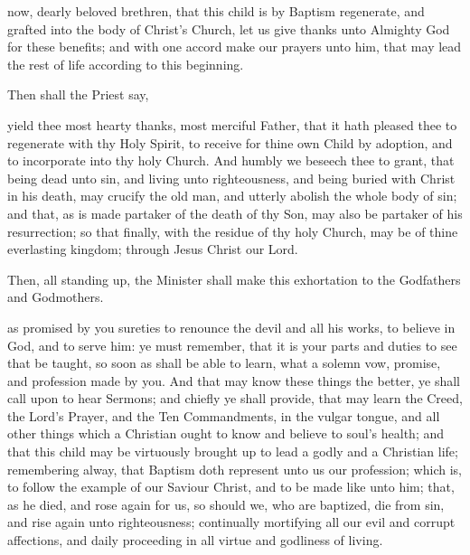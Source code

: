  now, dearly beloved brethren, that this child is by Baptism regenerate, and grafted into the body of Christ's Church, let us give thanks unto Almighty God for these benefits; and with one accord make our prayers unto him, that  may lead the rest of  life according to this beginning.

\begin{rubric}
Then shall the Priest say,
\end{rubric}

 yield thee most hearty thanks, most merciful Father, that it hath pleased thee to regenerate  with thy Holy Spirit, to receive  for thine own Child by adoption, and to incorporate  into thy holy Church.
And humbly we beseech thee to grant, that  being dead unto sin, and living unto righteousness, and being buried with Christ in his death, may crucify the old man, and utterly abolish the whole body of sin; and that, as  is made partaker of the death of thy Son,  may also be partaker of his resurrection; so that finally, with the residue of thy holy Church,  may be  of thine everlasting kingdom; through Jesus Christ our Lord.

\newpage

\begin{rubric}
Then, all standing up, the Minister shall make this exhortation to the Godfathers and Godmothers.
\end{rubric}

 as  promised by you  sureties to renounce the devil and all his works, to believe in God, and to serve him: ye must remember, that it is your parts and duties to see that  be taught, so soon as  shall be able to learn, what a solemn vow, promise, and profession  made by you.
And that  may know these things the better, ye shall call upon  to hear Sermons; and chiefly ye shall provide, that  may learn the Creed, the Lord's Prayer, and the Ten Commandments, in the vulgar tongue, and all other things which a Christian ought to know and believe to  soul's health; and that this child may be virtuously brought up to lead a godly and a Christian life; remembering alway, that Baptism doth represent unto us our profession; which is, to follow the example of our Saviour Christ, and to be made like unto him; that, as he died, and rose again for us, so should we, who are baptized, die from sin, and rise again unto righteousness; continually mortifying all our evil and corrupt affections, and daily proceeding in all virtue and godliness of living.

